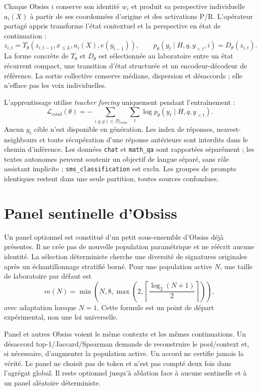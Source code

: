 \documentclass[11pt,a4paper]{report}
\begin{document}
Chaque Obsiss $i$ conserve son identité $w_i$ et produit sa perspective individuelle $a_i(X)$ à partir de ses coordonnées d'origine et des activations P/R. L'opérateur partagé appris transforme l'état contextuel et la perspective en état de continuation :
\[
z_{i,t}=T_\theta(z_{i,t-1},x_{\leq L},a_i(X),e(y_{t-1})),\qquad
p_\theta(y_t\mid H,q,y_{<t},i)=D_\theta(z_{i,t}).
\]
La forme concrète de $T_\theta$ et $D_\theta$ est sélectionnée au laboratoire entre un état récurrent compact, une transition d'état structurée et un encodeur-décodeur de référence. La sortie collective conserve médiane, dispersion et désaccords ; elle n'efface pas les voix individuelles.

L'apprentissage utilise \textit{teacher forcing} uniquement pendant l'entraînement :
\[
\mathcal{L}_{cond}(\theta)=-\sum_{(q,y)\in\mathcal{D}_{train}}
\sum_t\log p_\theta(y_t\mid H,q,y_{<t}).
\]
Aucun $y_t$ cible n'est disponible en génération. Les index de réponses, nearest-neighbours et toute récupération d'une réponse antérieure sont interdits dans le chemin d'inférence. Les données \texttt{chat} et \texttt{math\_qa} sont rapportées séparément ; les textes autonomes peuvent soutenir un objectif de langue séparé, sans rôle assistant implicite ; \texttt{sms\_classification} est exclu. Les groupes de prompts identiques restent dans une seule partition, toutes sources confondues.

\section{Panel sentinelle d'Obsiss}
Un panel optionnel est constitué d'un petit sous-ensemble d'Obsiss déjà présentes. Il ne crée pas de nouvelle population paramétrique et ne réécrit aucune identité. La sélection déterministe cherche une diversité de signatures originales après un échantillonnage stratifié borné. Pour une population active $N$, une taille de laboratoire par défaut est
\[
m(N)=\min\left(N,8,\max\left(2,\left\lceil\frac{\log_2(N+1)}{2}\right\rceil\right)\right),
\]
avec adaptation lorsque $N=1$. Cette formule est un point de départ expérimental, non une loi universelle.

Panel et autres Obsiss voient le même contexte et les mêmes continuations. Un désaccord top-1/Jaccard/Spearman demande de reconstruire le pool/context et, si nécessaire, d'augmenter la population active. Un accord ne certifie jamais la vérité. Le panel ne choisit pas de token et n'est pas compté deux fois dans l'agrégat global. Il reste optionnel jusqu'à ablation face à aucune sentinelle et à un panel aléatoire déterministe.
\end{document}
